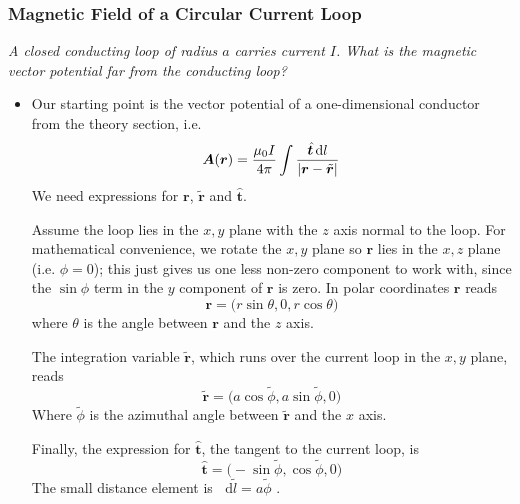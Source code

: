 \documentclass[11pt, a4paper]{article}
\newcommand{\diff}{\mathop{}\!\mathrm{d}} %
\renewcommand{\vec}[1]{\bm{#1}} %
\newcommand{\uvec}[1]{\hat{\vec{#1}}} %
\newcommand{\tvec}[1]{\tilde{\vec{#1}}} %
\renewcommand{\r}{\vec{r}}
\newcommand{\A}{\vec{A}}  %
\begin{document}
\subsubsection{Magnetic Field of a Circular Current Loop}
\textit{A closed conducting loop of radius $ a $ carries current $ I $. What is the magnetic vector potential far from the conducting loop?}
\begin{itemize}
	\item Our starting point is the vector potential of a one-dimensional conductor from the theory section, i.e.
	\begin{equation*}
		\A(\r) = \frac{\mu_{0}I}{4\pi} \int \frac{\uvec{t} \diff l}{\abs{\r - \tvec{r}}}
	\end{equation*}
	We need expressions for $ \r $, $ \tvec{r} $ and $ \uvec{t} $.
	
	Assume the loop lies in the $ x, y $ plane with the $ z $ axis normal to the loop. For mathematical convenience, we rotate the $ x, y $ plane so $ \r $ lies in the $ x, z $ plane (i.e. $ \phi = 0 $); this just gives us one less non-zero component to work with, since the $ \sin \phi $ term in the $ y $ component of $ \r $ is zero. In polar coordinates $ \r $ reads
	\begin{equation*}
		\r = \big (r \sin \theta, 0, r \cos \theta \big )
	\end{equation*}
	where $ \theta $ is the angle between $ \r $ and the $ z $ axis. 
	
	The integration variable $ \tvec{r} $, which runs over the current loop in the $ x, y $ plane, reads
	\begin{equation*}
		\tvec{r} = \big(a \cos \tilde{\phi}, a \sin \tilde{\phi}, 0 \big)
	\end{equation*}
	Where $ \tilde{\phi} $ is the azimuthal angle between $ \tvec{r} $ and the $ x $ axis. 
	
	Finally, the expression for $ \uvec{t} $, the tangent to the current loop, is
	\begin{equation*}
		\uvec{t} = \big( -\sin \tilde{\phi},  \cos \tilde{\phi}, 0\big)
	\end{equation*}
	The small distance element is $ \diff \tilde{l} = a \tilde{\phi}$ .
	

\end{itemize}
\end{document}
